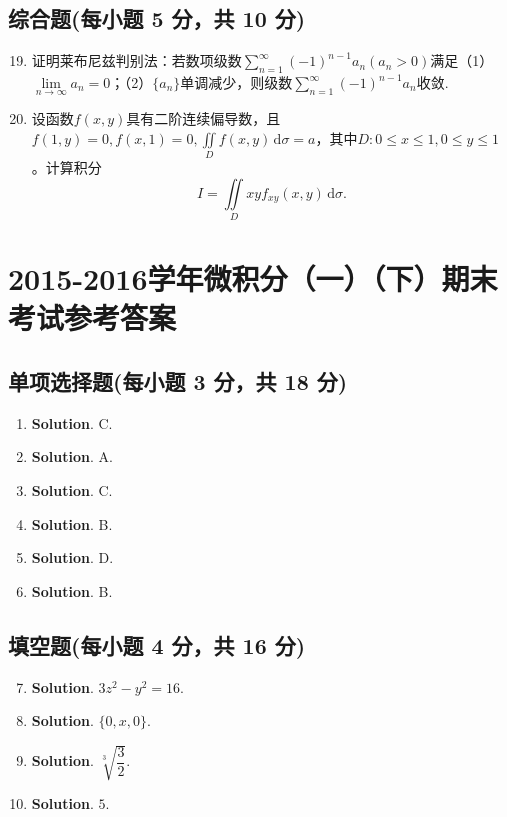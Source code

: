 \documentclass[../Main.tex]{subfiles}
\begin{document}
\section{综合题(每小题 5 分，共 10 分)}
\begin{enumerate}
  \setcounter{enumi}{18}
  \item 证明莱布尼兹判别法：若数项级数$\displaystyle\sum_{n=1}^{\infty}(-1)^{n-1}a_{n}(a_{n}>0)$满足（1）$\lim\limits_{n\to\infty}a_{n}=0$；（2）$\{a_{n}\}$单调减少，则级数$\displaystyle\sum_{n=1}^{\infty}(-1)^{n-1}a_{n}$收敛.
        \vspace{15em}

  \item 设函数$f(x,y)$具有二阶连续偏导数，且$f(1,y)=0,f(x,1)=0,\iint\limits_{D}f(x,y)\,\mathrm{d}\sigma=a$，其中$D:0\leq x\leq1,0\leq y\leq1$。计算积分
        \[
          I=\iint\limits_{D}xyf_{xy}(x,y)\,\mathrm{d}\sigma.
        \]
        \vspace{15em}
\end{enumerate}

\chapter{2015-2016学年微积分（一）（下）期末考试参考答案}
\section{单项选择题(每小题 3 分，共 18 分)}
\begin{enumerate}
  \item \textbf{Solution}. C.
  \item \textbf{Solution}. A.
  \item \textbf{Solution}. C.
  \item \textbf{Solution}. B.
  \item \textbf{Solution}. D.
  \item \textbf{Solution}. B.
\end{enumerate}

\section{填空题(每小题 4 分，共 16 分)}
\begin{enumerate}
  \setcounter{enumi}{6}
  \item \textbf{Solution}. $3z^{2}-y^{2}=16$.
  \item \textbf{Solution}. $\{0,x,0\}$.
  \item \textbf{Solution}. $\sqrt[3]{\dfrac{3}{2}}$.
  \item \textbf{Solution}. $5$.
\end{enumerate}
\end{document}
